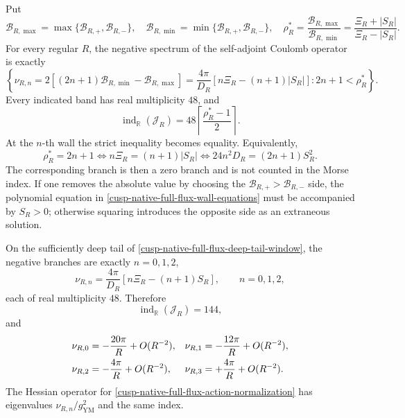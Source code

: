 \begin{theorem}
\label{cusp-native-full-flux-Morse-theorem}
Put
\begin{equation}
 \mathcal B_{R,\max}=\max\{\mathcal B_{R,+},\mathcal B_{R,-}\},
 \quad
 \mathcal B_{R,\min}=\min\{\mathcal B_{R,+},\mathcal B_{R,-}\},
 \quad
 \rho_R^*=\frac{\mathcal B_{R,\max}}{\mathcal B_{R,\min}}
 =\frac{\Xi_R+|S_R|}{\Xi_R-|S_R|}.
 \label{cusp-native-full-flux-ordered-ratio}
\end{equation}
For every regular \(R\), the negative spectrum of the self-adjoint Coulomb
operator is exactly
\begin{equation}
 \left\{
 \nu_{R,n}=2[(2n+1)\mathcal B_{R,\min}-\mathcal B_{R,\max}]
 =\frac{4\pi}{D_R}[n\Xi_R-(n+1)|S_R|]:
 2n+1<\rho_R^*
 \right\}.
 \label{cusp-native-full-flux-general-negative-spectrum}
\end{equation}
Every indicated band has real multiplicity \(48\), and
\begin{equation}
 \operatorname{ind}_{\mathbb R}(\mathcal J_R)
 =48\left\lceil\frac{\rho_R^*-1}{2}\right\rceil.
 \label{cusp-native-full-flux-general-index}
\end{equation}
At the \(n\)-th wall the strict inequality becomes equality.  Equivalently,
\begin{equation}
 \rho_R^*=2n+1
 \iff n\Xi_R=(n+1)|S_R|
 \iff 24n^2D_R=(2n+1)S_R^2.
 \label{cusp-native-full-flux-wall-equations}
\end{equation}
The corresponding branch is then a zero branch and is not counted in the
Morse index.  If one removes the absolute value by choosing the
\(\mathcal B_{R,+}>\mathcal B_{R,-}\) side, the polynomial equation in
\cref{cusp-native-full-flux-wall-equations} must be accompanied by \(S_R>0\);
otherwise squaring introduces the opposite side as an extraneous solution.

On the sufficiently deep tail of
\cref{cusp-native-full-flux-deep-tail-window}, the negative branches are
exactly \(n=0,1,2\),
\begin{equation}
 \nu_{R,n}=\frac{4\pi}{D_R}[n\Xi_R-(n+1)S_R],
 \qquad n=0,1,2,
 \label{cusp-native-full-flux-deep-negative-branches}
\end{equation}
each of real multiplicity \(48\).  Therefore
\begin{equation}
 \operatorname{ind}_{\mathbb R}(\mathcal J_R)=144,
 \label{cusp-native-full-flux-deep-index}
\end{equation}
and
\begin{align}
 \nu_{R,0}&=-\frac{20\pi}{R}+O(R^{-2}),&
 \nu_{R,1}&=-\frac{12\pi}{R}+O(R^{-2}),\notag\\
 \nu_{R,2}&=-\frac{4\pi}{R}+O(R^{-2}),&
 \nu_{R,3}&=+\frac{4\pi}{R}+O(R^{-2}).
 \label{cusp-native-full-flux-negative-asymptotics}
\end{align}
The Hessian operator for
\cref{cusp-native-full-flux-action-normalization} has eigenvalues
\(\nu_{R,n}/g_{\mathrm{YM}}^2\) and the same index.
\end{theorem}

